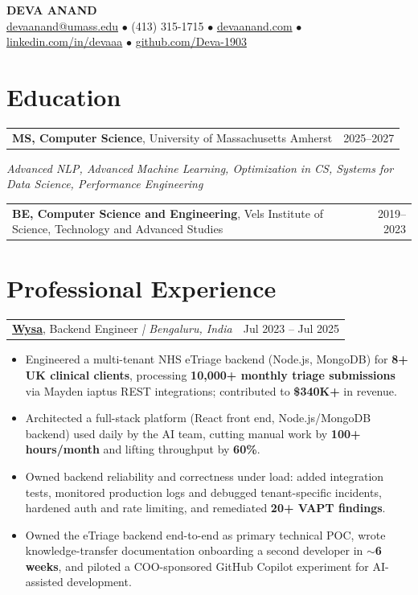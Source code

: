 \documentclass[letterpaper,11pt]{article}
\makeatletter
\newcommand{\eduItem}[3]{%
  \begin{tabular*}{\textwidth}{@{}l@{\extracolsep{\fill}}r@{}}
    \textbf{#1}, #2 & #3 \\
  \end{tabular*}\par
}
\newcommand{\expItem}[4]{%
  \vspace{3pt}
  \begin{tabular*}{\textwidth}{@{}l@{\extracolsep{\fill}}r@{}}
    \textbf{#1}, #2 \textit{| #3} & #4 \\
  \end{tabular*}\par\vspace{-2pt}
}
\makeatother
\begin{document}
\begin{center}
    {\fontsize{18}{20}\selectfont\bfseries DEVA ANAND}\\ \vspace{3pt}
    {\small
    \href{mailto:devaanand@umass.edu}{devaanand@umass.edu}
    \enspace$\bullet$\enspace
    (413) 315-1715
    \enspace$\bullet$\enspace
    \href{https://devaanand.com}{devaanand.com}
    \enspace$\bullet$\enspace
    \href{https://linkedin.com/in/devaaa/}{linkedin.com/in/devaaa}
    \enspace$\bullet$\enspace
    \href{https://github.com/Deva-1903}{github.com/Deva-1903}}
\end{center}
\vspace{-6pt}

\section{Education}
\eduItem{MS, Computer Science}{University of Massachusetts Amherst}{2025--2027}
{\small\textit{Advanced NLP, Advanced Machine Learning, Optimization in CS, Systems for Data Science, Performance Engineering}}\par
\vspace{3pt}
\eduItem{BE, Computer Science and Engineering}{Vels Institute of Science, Technology and Advanced Studies}{2019--2023}

\section{Professional Experience}

\expItem{\href{https://www.wysa.io}{Wysa}}{Backend Engineer}{Bengaluru, India}{Jul 2023 -- Jul 2025}
\begin{itemize}
  \item Engineered a multi-tenant NHS eTriage backend (Node.js, MongoDB) for \textbf{8+ UK clinical clients}, processing \textbf{10{,}000+ monthly triage submissions} via Mayden iaptus REST integrations; contributed to \textbf{\$340K+} in revenue.
  \item Architected a full-stack platform (React front end, Node.js/MongoDB backend) used daily by the AI team, cutting manual work by \textbf{100+ hours/month} and lifting throughput by \textbf{60\%}.
  \item Owned backend reliability and correctness under load: added integration tests, monitored production logs and debugged tenant-specific incidents, hardened auth and rate limiting, and remediated \textbf{20+ VAPT findings}.
  \item Owned the eTriage backend end-to-end as primary technical POC, wrote knowledge-transfer documentation onboarding a second developer in \textbf{$\sim$6 weeks}, and piloted a COO-sponsored GitHub Copilot experiment for AI-assisted development.
\end{itemize}
\end{document}
